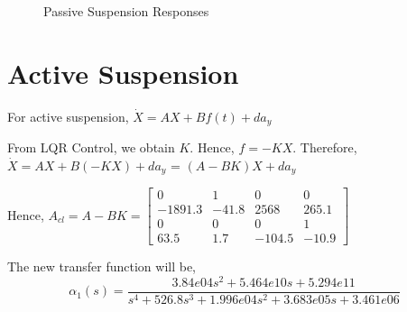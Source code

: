 \documentclass[12pt, a4paper, oneside]{report}
\begin{document}
\begin{figure}[h]
    \hfill
    \par 
    \caption{Passive Suspension Responses}
    \label{fig:Q4_passive_responses}
\end{figure}

\section{Active Suspension}

For active suspension, $ \dot X = A X + B f(t) + d a_y $

From LQR Control, we obtain $K$. Hence, $f = -K X$.
Therefore, $ \dot X = A X + B (-K X) + d a_y $ = $ (A - B K) X + d a_y $

Hence, $ A_{cl} = A - B K = \begin{bmatrix}
    0 & 1 & 0 & 0 \\
    -1891.3 & -41.8 & 2568 & 265.1 \\
    0 & 0 & 0 & 1 \\
    63.5 & 1.7 & -104.5 & -10.9
\end{bmatrix}$

The new transfer function will be,
\begin{equation}
    \alpha_1 (s) = \frac{3.84e04 s^2 + 5.464e10 s + 5.294e11}{ s^4 + 526.8 s^3 + 1.996e04 s^2 + 3.683e05 s + 3.461e06}
    \label{eq:Q4_active_alpha1}
\end{equation}
\end{document}
